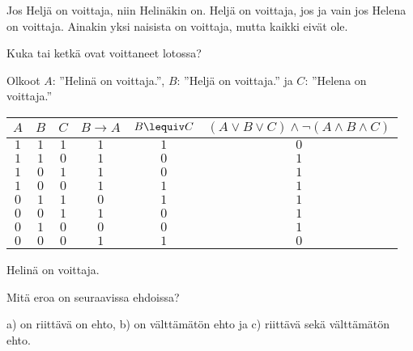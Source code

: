 \begin{kotitehtavasivu}
\begin{tehtava}
Jos Heljä on voittaja, niin Helinäkin on. 
Heljä on voittaja, jos ja vain jos Helena on voittaja.
Ainakin yksi naisista on voittaja, mutta kaikki eivät ole.

Kuka tai ketkä ovat voittaneet lotossa?

    \begin{vastaus}
    
        Olkoot $A$: ''Helinä on voittaja.'', $B$: ''Heljä on voittaja.'' ja $C$: ''Helena on voittaja.''
        \begin{center}
		    \begin{tabular}{|c|c|c|c|c|c|}\hline
		    $A$ & $B$ & $C$ & $B\to A$ & $B\lequiv C$ & $(A\lor B\lor C)\land \lnot(A\land B\land C)$ \\ \hline
		    $1$ & $1$ & $1$ & $1$ & $1$ & $0$ \\ %
		    $1$ & $1$ & $0$ & $1$ & $0$ & $1$ \\
		    $1$ & $0$ & $1$ & $1$ & $0$ & $1$ \\
		    $1$ & $0$ & $0$ & $1$ & $1$ & $1$ \\
		    $0$ & $1$ & $1$ & $0$ & $1$ & $1$ \\
		    $0$ & $0$ & $1$ & $1$ & $0$ & $1$ \\
		    $0$ & $1$ & $0$ & $0$ & $0$ & $1$ \\
		    $0$ & $0$ & $0$ & $1$ & $1$ & $0$ \\ \hline
\end{tabular}
\end{center}
Helinä on voittaja.
    \end{vastaus}
    
\end{tehtava}

\begin{tehtava}
     Mitä eroa on seuraavissa ehdoissa?
    \begin{alakohdat}
    \end{alakohdat}

    \begin{vastaus}
        a) on riittävä on ehto, b) on välttämätön ehto ja c) riittävä sekä välttämätön ehto. %
    \end{vastaus}
    

\end{tehtava}
\end{kotitehtavasivu}
